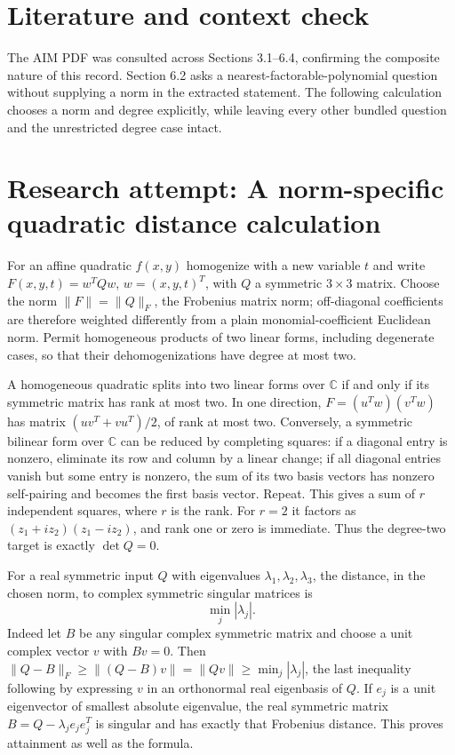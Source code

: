 \documentclass[11pt]{article}
\begin{document}
\section{Literature and context check}
The AIM PDF was consulted across Sections 3.1--6.4, confirming the composite
nature of this record. Section 6.2 asks a nearest-factorable-polynomial question
without supplying a norm in the extracted statement. The following calculation
chooses a norm and degree explicitly, while leaving every other bundled question
and the unrestricted degree case intact.
\section{Research attempt: A norm-specific quadratic distance calculation}
For an affine quadratic $f(x,y)$ homogenize with a new variable $t$ and write
$F(x,y,t)=w^TQw$, $w=(x,y,t)^T$, with $Q$ a symmetric $3\times3$ matrix.
Choose the norm $\|F\|=\|Q\|_F$, the Frobenius matrix norm; off-diagonal
coefficients are therefore weighted differently from a plain monomial-coefficient
Euclidean norm. Permit homogeneous products of two linear forms, including
degenerate cases, so that their dehomogenizations have degree at most two.

A homogeneous quadratic splits into two linear forms over $\mathbb C$ if and
only if its symmetric matrix has rank at most two. In one direction,
$F=(u^Tw)(v^Tw)$ has matrix $(uv^T+vu^T)/2$, of rank at most two. Conversely,
a symmetric bilinear form over $\mathbb C$ can be reduced by completing squares:
if a diagonal entry is nonzero, eliminate its row and column by a linear change;
if all diagonal entries vanish but some entry is nonzero, the sum of its two
basis vectors has nonzero self-pairing and becomes the first basis vector.
Repeat. This gives a sum of $r$ independent squares, where $r$ is the rank.
For $r=2$ it factors as $(z_1+iz_2)(z_1-iz_2)$, and rank one or zero is
immediate. Thus the degree-two target is exactly $\det Q=0$.

For a real symmetric input $Q$ with eigenvalues $\lambda_1,\lambda_2,\lambda_3$,
the distance, in the chosen norm, to complex symmetric singular matrices is
\[
 \min_j|\lambda_j|.
\]
Indeed let $B$ be any singular complex symmetric matrix and choose a unit
complex vector $v$ with $Bv=0$. Then
$\|Q-B\|_F\ge\|(Q-B)v\|=\|Qv\|\ge\min_j|\lambda_j|$, the last inequality
following by expressing $v$ in an orthonormal real eigenbasis of $Q$.
If $e_j$ is a unit eigenvector of smallest absolute eigenvalue, the real
symmetric matrix $B=Q-\lambda_je_je_j^T$ is singular and has exactly that
Frobenius distance. This proves attainment as well as the formula.
\end{document}
